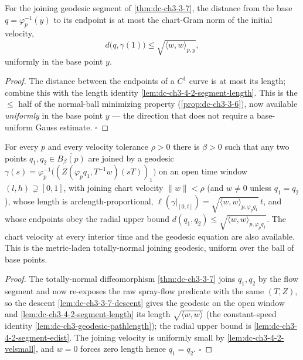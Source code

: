 \begin{lemma}
  \label{lem:dc-ch3-4-2-segment-edist}
  \leanok
  For the joining geodesic segment of \cref{thm:dc-ch3-3-7}, the distance from the base
  $q=\varphi_p^{-1}(y)$ to its endpoint is at most the chart-Gram norm of the initial velocity,
  \[
    d\big(q,\gamma(1)\big)\le\sqrt{\langle w,w\rangle_{p,y}},
  \]
  uniformly in the base point $y$.
\end{lemma}
\begin{proof}
  \leanok
  The distance between the endpoints of a $C^1$ curve is at most its length; combine this with the
  length identity \cref{lem:dc-ch3-4-2-segment-length}. This is the $\le$ half of the normal-ball
  minimizing property (\cref{prop:dc-ch3-3-6}), now available \emph{uniformly} in the base point $y$
  --- the direction that does not require a base-uniform Gauss estimate. $\square$
\end{proof}

\begin{lemma}
  \label{lem:dc-ch3-4-2-join-metric}
  \leanok
  For every $p$ and every velocity tolerance $\rho>0$ there is $\beta>0$ such that any two points
  $q_1,q_2\in\overline{B_\beta(p)}$ are joined by a geodesic
  $\gamma(s)=\varphi_p^{-1}\big((Z(\varphi_p q_1,T^{-1}w)(sT))_1\big)$ on an open time window
  $(l,h)\supsetneq[0,1]$, with joining chart velocity $\|w\|<\rho$ (and $w\neq0$ unless $q_1=q_2$),
  whose length is arclength-proportional,
  $\ell(\gamma|_{[0,t]})=\sqrt{\langle w,w\rangle_{p,\varphi_p q_1}}\,t$, and whose endpoints obey the
  radial upper bound $d(q_1,q_2)\le\sqrt{\langle w,w\rangle_{p,\varphi_p q_1}}$. The chart velocity at
  every interior time and the geodesic equation are also available. This is the metric-laden
  totally-normal joining geodesic, uniform over the ball of base points.
\end{lemma}
\begin{proof}
  \leanok
  The totally-normal diffeomorphism \cref{thm:dc-ch3-3-7} joins $q_1,q_2$ by the flow segment and now
  re-exposes the raw spray-flow predicate with the same $(T,Z)$, so the descent
  \cref{lem:dc-ch3-3-7-descent} gives the geodesic on the open window and
  \cref{lem:dc-ch3-4-2-segment-length} its length $\sqrt{\langle w,w\rangle}$ (the constant-speed
  identity \cref{lem:dc-ch3-geodesic-pathlength}); the radial upper bound is
  \cref{lem:dc-ch3-4-2-segment-edist}. The joining velocity is uniformly small by
  \cref{lem:dc-ch3-4-2-velsmall}, and $w=0$ forces zero length hence $q_1=q_2$. $\square$
\end{proof}

